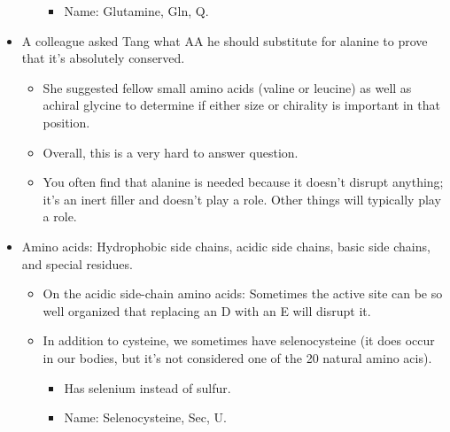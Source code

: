 \documentclass[../notes.tex]{subfiles}
\begin{document}
\begin{itemize}
\begin{itemize}
\begin{itemize}
            \item Name: Glutamine, Gln, Q.
        \end{itemize}
    \end{itemize}
    \item A colleague asked Tang what AA he should substitute for alanine to prove that it's absolutely conserved.
    \begin{itemize}
        \item She suggested fellow small amino acids (valine or leucine) as well as achiral glycine to determine if either size or chirality is important in that position.
        \item Overall, this is a very hard to answer question.
        \item You often find that alanine is needed because it doesn't disrupt anything; it's an inert filler and doesn't play a role. Other things will typically play a role.
    \end{itemize}
    \item Amino acids: Hydrophobic side chains, acidic side chains, basic side chains, and special residues.
    \begin{itemize}
        \item On the acidic side-chain amino acids: Sometimes the active site can be so well organized that replacing an D with an E will disrupt it.
        \item In addition to cysteine, we sometimes have selenocysteine (it does occur in our bodies, but it's not considered one of the 20 natural amino acis).
        \begin{itemize}
            \item Has selenium instead of sulfur.
            \item Name: Selenocysteine, Sec, U.
        \end{itemize}
    \end{itemize}
\end{itemize}
\end{document}
